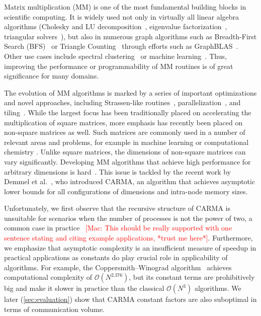 \documentclass[sigplan,review,anonymous]{acmart}\settopmatter{printfolios=true,printccs=false,printacmref=false}
\newcommand\mac[1]{\textcolor{red}{[Mac: #1]}}
\begin{document}
Matrix multiplication (MM) is one of the most fundamental building blocks in
scientific computing. It is widely used not only in virtually all linear
algebra algorithms (Cholesky and LU decomposition~\cite{meyer2000matrix},
eigenvalue factorization~\cite{chatelin2012eigenvalues}, triangular
solvers~\cite{linearAlgebraLAPACK}), but also in numerous graph algorithms such
as Breadth-First Search (BFS)~\cite{cormen2009introduction} or Triangle
Counting~\cite{azad2015parallel} through efforts such as
GraphBLAS~\cite{kepner2016mathematical}.  Other use cases include spectral
clustering~\cite{ng2002spectral} or machine
learning~\cite{abadi2016tensorflow}.  Thus, improving the performance or
programmability of MM routines is of great significance for many domains.

%
The evolution of MM algorithms is marked by a series of important optimizations
and novel approaches, including Strassen-like routines~\cite{Strassen}, 
parallelization~\cite{parallelMMM},
and tiling~\cite{tiling}.
%
While the largest focus has been traditionally placed on accelerating the
multiplication of square matrices, more emphasis has recently been placed on
non-square matrices as well. Such matrices are commonly used in a number of
relevant areas and problems, for example in machine learning
\cite{rectangularML} or computational chemistry \cite{rectangularChemistry}.
%
Unlike square matrices, the dimensions of non-square matrices can vary
significantly. Developing MM algorithms that achieve high performance for
arbitrary dimensions is hard~\cite{sth}.
%
This issue is tackled by the recent work by Demmel et al.~\cite{CARMA}, who
introduced CARMA, an algorithm that achieves asymptotic lower bounds for all 
configurations of dimensions and intra-node memory sizes.

Unfortunately, we first observe that the recursive structure of CARMA is
unsuitable for scenarios when the number of processes is not the power of two,
a common case in practice~\cite{sth} \mac{This should be really
supported with one sentence stating and citing example applications, 
*trust me here*}. Furthermore, we emphasize that asymptotic complexity is an
insufficient measure of speedup in practical applications as constants do play
crucial role in applicability of algorithms. For example, the
Coppersmith--Winograd algorithm~\cite{coppersmith} achieves computational
complexity of $\mathcal{O}(N^{2.376})$, but its constant terms are prohibitively big and
make it slower in practice than the classical $\mathcal{O}(N^{3})$ algorithms. 
We later (\cref{sec:evaluation}) show that CARMA constant factors are also 
suboptimal in terms of communication volume.
\end{document}
